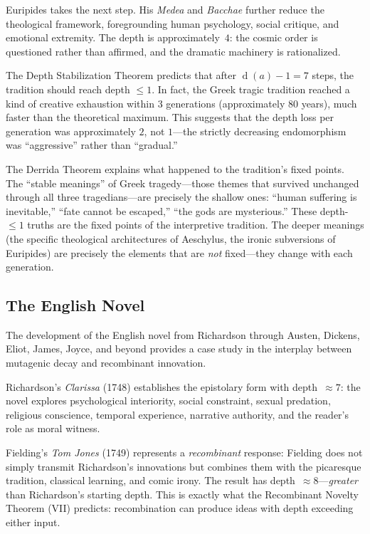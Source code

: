 \documentclass[11pt,openany]{book}
\theoremstyle{definition}
\theoremstyle{plain}
\theoremstyle{remark}
\newcommand{\depth}{\operatorname{d}}       %
\begin{document}
Euripides takes the next step. His \emph{Medea} and \emph{Bacchae} further reduce the theological framework, foregrounding human psychology, social critique, and emotional extremity. The depth is approximately~$4$: the cosmic order is questioned rather than affirmed, and the dramatic machinery is rationalized.

The Depth Stabilization Theorem predicts that after $\depth(a) - 1 = 7$ steps, the tradition should reach depth $\leq 1$. In fact, the Greek tragic tradition reached a kind of creative exhaustion within 3 generations (approximately 80 years), much faster than the theoretical maximum. This suggests that the depth loss per generation was approximately $2$, not $1$---the strictly decreasing endomorphism was ``aggressive'' rather than ``gradual.''

The Derrida Theorem explains what happened to the tradition's fixed points. The ``stable meanings'' of Greek tragedy---those themes that survived unchanged through all three tragedians---are precisely the shallow ones: ``human suffering is inevitable,'' ``fate cannot be escaped,'' ``the gods are mysterious.'' These depth-$\leq 1$ truths are the fixed points of the interpretive tradition. The deeper meanings (the specific theological architectures of Aeschylus, the ironic subversions of Euripides) are precisely the elements that are \emph{not} fixed---they change with each generation.

\subsection{The English Novel}

The development of the English novel from Richardson through Austen, Dickens, Eliot, James, Joyce, and beyond provides a case study in the interplay between mutagenic decay and recombinant innovation.

Richardson's \emph{Clarissa} (1748) establishes the epistolary form with depth~$\approx 7$: the novel explores psychological interiority, social constraint, sexual predation, religious conscience, temporal experience, narrative authority, and the reader's role as moral witness.

Fielding's \emph{Tom Jones} (1749) represents a \emph{recombinant} response: Fielding does not simply transmit Richardson's innovations but combines them with the picaresque tradition, classical learning, and comic irony. The result has depth~$\approx 8$---\emph{greater} than Richardson's starting depth. This is exactly what the Recombinant Novelty Theorem (VII) predicts: recombination can produce ideas with depth exceeding either input.
\end{document}
